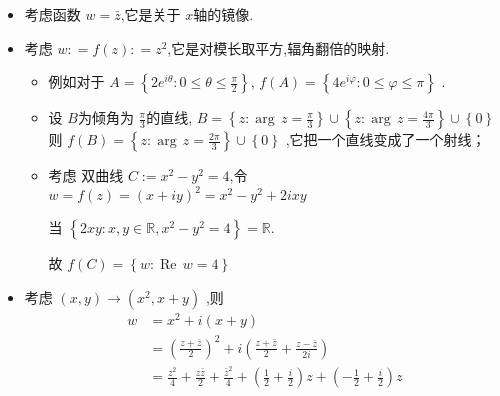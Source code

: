\documentclass[../../复变函数.tex]{subfiles}
\begin{document}
\begin{example}
    \begin{itemize}
        \item 考虑函数 \(  w =  \bar{z}  \),它是关于 \(  x  \)轴的镜像.  
        \item 考虑 \(  w : =  f\left( z \right): =  z^{2}   \),它是对模长取平方,辐角翻倍的映射.
        \begin{itemize}
            \item 例如对于 \(  A =  \left\{ 2e^{i \theta }: 0\le  \theta \le  \frac{\pi}{2} \right\}  \), \(  f\left( A \right)   =  \left\{ 4e^{i \varphi }: 0 \le  \varphi \le \pi  \right\}\) .
            \item 设 \(  B  \)为倾角为 \(  \frac{\pi  }{3 }   \)的直线, \(  B =  \left\{  z: \operatorname{arg}\,z =  \frac{\pi  }{3 }  \right\}\cup \left\{ z: \operatorname{arg}\,z=  \frac{4\pi  }{ 3}  \right\}\cup \left\{ 0 \right\}  \)  
            则 \(  f\left( B \right) =  \left\{ z: \operatorname{arg}\,z =  \frac{2\pi  }{3 }   \right\}   \cup  \left\{ 0 \right\}\)  ,它把一个直线变成了一个射线；
            \item 考虑 双曲线 \(C:=   x^{2}-y^{2}= 4  \),令 \(  w =  f\left( z \right)=  \left( x+ iy \right)^{2} =  x^{2}-y^{2} + 2ixy    \)   
            \begin{exercise}
                当 \(  \left\{ 2xy: x,y \in \mathbb{R} ,x^{2}-y^{2}= 4 \right\}= \mathbb{R}   \). 
            \end{exercise}
            故 \(  f\left( C \right) =  \left\{ w: \operatorname{Re}\,w= 4 \right\}  \) 
            
        \end{itemize}
        \item 考虑 \(  \left( x,y \right)\to \left( x^{2},x+ y \right)    \) ,则  \[
        \begin{aligned}
        w & =  x^{2}+ i\left( x+ y \right)\\ 
         & =   \left( \frac{z+ \bar{z} }{ 2}  \right)^{2}+ i \left(  \frac{z+ \bar{z} }{2 } +  \frac{z-\bar{z} }{2i }   \right)    \\ 
          & =   \frac{z^{2} }{4 } +  \frac{z \bar{z} }{2 }+  \frac{\bar{z}^{2} }{4 } +  \left( \frac{1}{2}+  \frac{i }{2 }  \right)z +  \left( -\frac{1}{2}+  \frac{i }{2 }  \right)z     
        \end{aligned}
        \]
          
    \end{itemize}
    
\end{example}
\end{document}
